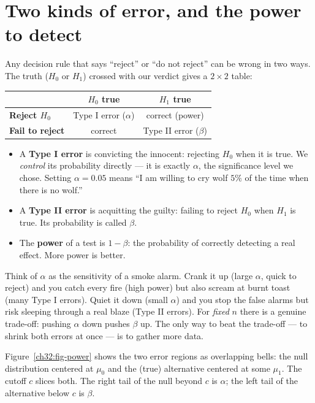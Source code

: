 \section{Two kinds of error, and the power to detect}
\label{ch32:errors}

Any decision rule that says ``reject'' or ``do not reject'' can be wrong in two ways.
The truth ($H_0$ or $H_1$) crossed with our verdict gives a $2\times 2$ table:

\begin{center}
\renewcommand{\arraystretch}{1.4}
\begin{tabular}{l|cc}
 & \textbf{$H_0$ true} & \textbf{$H_1$ true} \\ \hline
\textbf{Reject $H_0$} & Type I error ($\alpha$) & correct (power) \\
\textbf{Fail to reject} & correct & Type II error ($\beta$) \\
\end{tabular}
\end{center}

\begin{itemize}
  \item A \textbf{Type I error} is convicting the innocent: rejecting $H_0$ when it is
  true. We \emph{control} its probability directly --- it is exactly $\alpha$, the
  significance level we chose. Setting $\alpha=0.05$ means ``I am willing to cry wolf
  $5\%$ of the time when there is no wolf.''
  \item A \textbf{Type II error} is acquitting the guilty: failing to reject $H_0$ when
  $H_1$ is true. Its probability is called $\beta$.
  \item The \textbf{power} of a test is $1-\beta$: the probability of correctly detecting
  a real effect. More power is better.
\end{itemize}

\begin{intuitionbox}
Think of $\alpha$ as the sensitivity of a smoke alarm. Crank it up (large $\alpha$,
quick to reject) and you catch every fire (high power) but also scream at burnt toast
(many Type I errors). Quiet it down (small $\alpha$) and you stop the false alarms but
risk sleeping through a real blaze (Type II errors). For \emph{fixed} $n$ there is a
genuine trade-off: pushing $\alpha$ down pushes $\beta$ up. The only way to beat the
trade-off --- to shrink both errors at once --- is to gather more data.
\end{intuitionbox}

Figure~\ref{ch32:fig-power} shows the two error regions as overlapping bells: the null
distribution centered at $\mu_0$ and the (true) alternative centered at some $\mu_1$.
The cutoff $c$ slices both. The right tail of the null beyond $c$ is $\alpha$; the left
tail of the alternative below $c$ is $\beta$.

